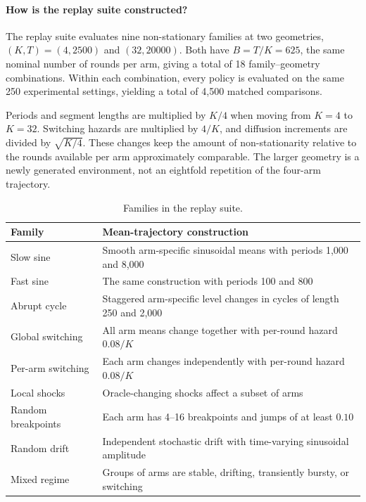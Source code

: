 \paragraph{How is the replay suite constructed?}
The replay suite evaluates nine non-stationary families at two geometries,
$(K,T)=(4,2500)$ and $(32,20000)$.
Both have $B=T/K=625$, the same nominal number of rounds per arm, giving a total of 18 family--geometry combinations.
Within each combination, every policy is evaluated on the same 250 experimental
settings, yielding a total of 4,500 matched comparisons.

Periods and segment lengths are multiplied by $K/4$ when moving from $K=4$
to $K=32$.
Switching hazards are multiplied by $4/K$, and diffusion increments are divided by $\sqrt{K/4}$.
These changes keep the amount of non-stationarity relative to the rounds available per arm approximately
comparable.
The larger geometry is a newly generated environment, not an eightfold repetition of the four-arm trajectory.

\begin{table}[p]
\centering
\footnotesize
\caption{Families in the replay suite.}
\label{tab:historical-environments}
\begin{tabular}{@{}p{}p{}@{}}
\toprule
Family & Mean-trajectory construction \\
\midrule
Slow sine &
Smooth arm-specific sinusoidal means with periods 1,000 and 8,000 \\
Fast sine &
The same construction with periods 100 and 800 \\
Abrupt cycle &
Staggered arm-specific level changes in cycles of length 250 and 2,000 \\
Global switching &
All arm means change together with per-round hazard $0.08/K$ \\
Per-arm switching &
Each arm changes independently with per-round hazard $0.08/K$ \\
Local shocks &
Oracle-changing shocks affect a subset of arms \\
Random breakpoints &
Each arm has 4--16 breakpoints and jumps of at least $0.10$ \\
Random drift &
Independent stochastic drift with time-varying sinusoidal amplitude \\
Mixed regime &
Groups of arms are stable, drifting, transiently bursty, or switching \\
\bottomrule
\end{tabular}
\end{table}

